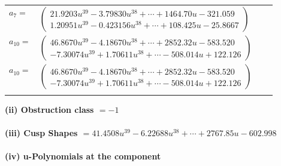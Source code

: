\documentclass[1p]{elsarticle_modified}
\theoremstyle{definition}
\begin{document}
\begin{tabular}{m{7pt} m{180pt} m{7pt} m{180pt} }
\flushright $a_{7}=$&$\begin{pmatrix}21.9203 u^{39}-3.79830 u^{38}+\cdots+1464.70 u-321.059\\1.20951 u^{39}-0.423156 u^{38}+\cdots+108.425 u-25.8667\end{pmatrix}$ \\
\flushright $a_{10}=$&$\begin{pmatrix}46.8670 u^{39}-4.18670 u^{38}+\cdots+2852.32 u-583.520\\-7.30074 u^{39}+1.70611 u^{38}+\cdots-508.014 u+122.126\end{pmatrix}$\\ \flushright $a_{10}=$&$\begin{pmatrix}46.8670 u^{39}-4.18670 u^{38}+\cdots+2852.32 u-583.520\\-7.30074 u^{39}+1.70611 u^{38}+\cdots-508.014 u+122.126\end{pmatrix}$\\&\end{tabular}
\flushleft \textbf{(ii) Obstruction class $= -1$}\\~\\
\flushleft \textbf{(iii) Cusp Shapes $= 41.4508 u^{39}-6.22688 u^{38}+\cdots+2767.85 u-602.998$}\\~\\
\newpage\renewcommand{\arraystretch}{1}
\flushleft \textbf{(iv) u-Polynomials at the component}\newline \\
\end{document}
